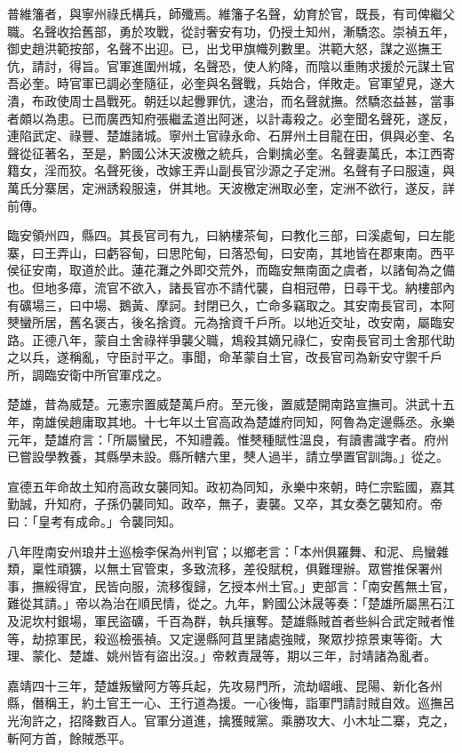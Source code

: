 \begin{pinyinscope}
普維籓者，與寧州祿氏構兵，師殲焉。維籓子名聲，幼育於官，既長，有司俾繼父職。名聲收拾舊部，勇於攻戰，從討奢安有功，仍授土知州，漸驕恣。崇禎五年，御史趙洪範按部，名聲不出迎。已，出戈甲旗幟列數里。洪範大怒，謀之巡撫王伉，請討，得旨。官軍進圍州城，名聲恐，使人約降，而陰以重賄求援於元謀土官吾必奎。時官軍已調必奎隨征，必奎與名聲戰，兵始合，佯敗走。官軍望見，遂大潰，布政使周士昌戰死。朝廷以起釁罪伉，逮治，而名聲就撫。然驕恣益甚，當事者頗以為患。已而廣西知府張繼孟道出阿迷，以計毒殺之。必奎聞名聲死，遂反，連陷武定、祿豐、楚雄諸城。寧州土官祿永命、石屏州土目龍在田，俱與必奎、名聲從征著名，至是，黔國公沐天波檄之統兵，合剿擒必奎。名聲妻萬氏，本江西寄籍女，淫而狡。名聲死後，改嫁王弄山副長官沙源之子定洲。名聲有子曰服遠，與萬氏分寨居，定洲誘殺服遠，併其地。天波檄定洲取必奎，定洲不欲行，遂反，詳前傳。

臨安領州四，縣四。其長官司有九，曰納樓茶甸，曰教化三部，曰溪處甸，曰左能寨，曰王弄山，曰虧容甸，曰思陀甸，曰落恐甸，曰安南，其地皆在郡東南。西平侯征安南，取道於此。蓮花灘之外即交荒外，而臨安無南面之虞者，以諸甸為之備也。但地多瘴，流官不欲入，諸長官亦不請代襲，自相冠帶，日尋干戈。納樓部內有礦場三，曰中場、鵝黃、摩訶。封閉已久，亡命多竊取之。其安南長官司，本阿僰蠻所居，舊名褒古，後名捨資。元為捨資千戶所。以地近交址，改安南，屬臨安路。正德八年，蒙自土舍祿祥爭襲父職，鴆殺其嫡兄祿仁，安南長官司土舍那代助之以兵，遂稱亂，守臣討平之。事聞，命革蒙自土官，改長官司為新安守禦千戶所，調臨安衛中所官軍戍之。

楚雄，昔為威楚。元憲宗置威楚萬戶府。至元後，置威楚開南路宣撫司。洪武十五年，南雄侯趙庸取其地。十七年以土官高政為楚雄府同知，阿魯為定邊縣丞。永樂元年，楚雄府言：「所屬蠻民，不知禮義。惟僰種賦性溫良，有讀書識字者。府州已嘗設學教養，其縣學未設。縣所轄六里，僰人過半，請立學置官訓誨。」從之。

宣德五年命故土知府高政女襲同知。政初為同知，永樂中來朝，時仁宗監國，嘉其勤誠，升知府，子孫仍襲同知。政卒，無子，妻襲。又卒，其女奏乞襲知府。帝曰：「皇考有成命。」令襲同知。

八年陞南安州琅井土巡檢李保為州判官；以鄉老言：「本州俱羅舞、和泥、烏蠻雜類，稟性頑獷，以無土官管束，多致流移，差役賦稅，俱難理辦。眾嘗推保署州事，撫綏得宜，民皆向服，流移復歸，乞授本州土官。」吏部言：「南安舊無土官，難從其請。」帝以為治在順民情，從之。九年，黔國公沐晟等奏：「楚雄所屬黑石江及泥坎村銀場，軍民盜礦，千百為群，執兵攘奪。楚雄縣賊首者些糾合武定賊者惟等，劫掠軍民，殺巡檢張禎。又定邊縣阿苴里諸處強賊，聚眾抄掠景東等衛。大理、蒙化、楚雄、姚州皆有盜出沒。」帝敕責晟等，期以三年，討靖諸為亂者。

嘉靖四十三年，楚雄叛蠻阿方等兵起，先攻易門所，流劫嶍峨、昆陽、新化各州縣，僭稱王，約土官王一心、王行道為援。一心後悔，詣軍門請討賊自效。巡撫呂光洵許之，招降數百人。官軍分道進，擒獲賊黨。乘勝攻大、小木址二寨，克之，斬阿方首，餘賊悉平。


\end{pinyinscope}
